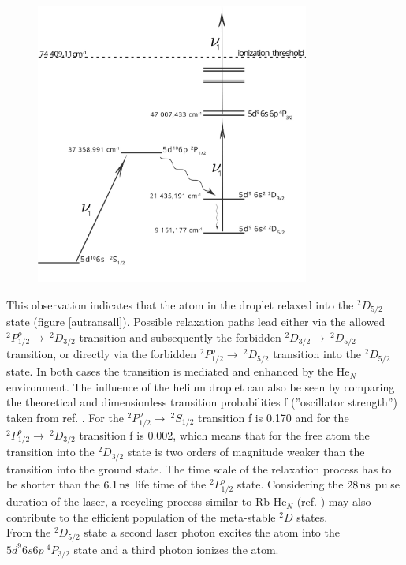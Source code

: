 \documentclass[parskip,12pt,headsepline,a4paper] {scrbook}
\begin{document}
\begin{figure}[h!t]
\centerline{
\includegraphics[width=9cm]{./results/au_trans.jpg}}
\end{figure}
This observation indicates that the atom in the droplet relaxed into the $^2D_{5/2}$ state (figure \ref{autransall}). Possible relaxation paths lead either via the allowed $^2P^o_{1/2} \rightarrow \ ^2D_{3/2}$ transition and subsequently the forbidden $^2D_{3/2} \rightarrow \ ^2D_{5/2}$ transition, or directly via the forbidden $^2P^o_{1/2} \rightarrow \ ^2D_{5/2}$ transition into the $^2D_{5/2}$ state. In both cases the transition is mediated and enhanced by the He$_N$ environment. The influence of the helium droplet can also be seen by comparing the theoretical and dimensionless transition probabilities f (''oscillator strength'') taken from ref. \cite{fivet}. For the $^2P^o_{1/2} \rightarrow \ ^2S_{1/2}$ transition f is 0.170 and for the $^2P^o_{1/2} \rightarrow \ ^2D_{3/2}$ transition f is 0.002, which means that for the free atom the transition into the $^2D_{3/2}$ state is two orders of magnitude weaker than the transition into the ground state. The time scale of the relaxation process has to be shorter than the $\unit[6.1]{ns}$ life time of the $^2P^o_{1/2}$ state. Considering the $\unit[28]{ns}$ pulse duration of the laser, a recycling process similar to Rb-He$_N$ (ref. \cite{aubock}) may also contribute to the efficient population of the meta-stable $^2D$ states. \\
From the $^2D_{5/2}$ state a second laser photon excites the atom into the $5d^9 6s 6p \ ^4P_{3/2}$ state and a third photon ionizes the atom.
\end{document}
